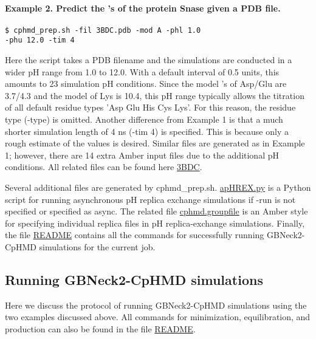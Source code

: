\paragraph{Example 2. Predict the {\pka's} of the protein Snase given a PDB file.}
%
\begin{lstlisting}
$ cphmd_prep.sh -fil 3BDC.pdb -mod A -phl 1.0
-phu 12.0 -tim 4
\end{lstlisting}
%
Here the script takes a PDB filename and the simulations are conducted in a wider pH range from 1.0 to 12.0. 
With a default interval of 0.5 units, this
amounts to 23 simulation pH conditions.
Since the model {\pka's} of Asp/Glu are 3.7/4.3 and 
the model {\pka} of Lys is 10.4, this pH range 
typically allows the titration of
all default residue types 'Asp Glu His Cys Lys'.
For this reason, the residue type (-type) is omitted. 
Another difference from Example 1 is that a much shorter simulation length of 4 ns (-tim 4) is specified.
This is because only a rough estimate of the {\pka} values is desired. 
Similar files are generated as in Example 1; however, 
there are 14 extra Amber input files due to the additional pH conditions.
All related files can be found here \href{https://gitlab.com/shenlab-amber-cphmd/cphmd-tutorial/-/tree/main/gphmd_Amber/gphmd_snase_aphrex/3BDC}{3BDC}. 

Several additional files are generated by cphmd\_prep.sh.
\href{https://gitlab.com/shenlab-amber-cphmd/cphmd-tutorial/-/tree/main/gphmd_Amber/gphmd_kinase_aphrex/5U8L/apHREX.py}{apHREX.py}
is a Python script for running asynchronous pH replica exchange simulations if -run is not specified or specified as async. 
The related file
\href{https://gitlab.com/shenlab-amber-cphmd/cphmd-tutorial/-/tree/main/gphmd_Amber/gphmd_snase_phrex/3BDC/cphmd.groupfile}{cphmd.groupfile} 
is an Amber style for specifying individual replica files in pH replica-exchange simulations. 
Finally, the file \href{https://gitlab.com/shenlab-amber-cphmd/cphmd-tutorial/-/tree/main/gphmd_Amber/gphmd_snase_phrex/3BDC/README}{README} contains all the commands for successfully running GBNeck2-CpHMD simulations for the current job. 

\subsection{Running GBNeck2-CpHMD simulations}
Here we discuss the protocol of running GBNeck2-CpHMD simulations using the two examples discussed above.
All commands for minimization, equilibration, and production can also be found in the file
\href{
https://gitlab.com/shenlab-amber-cphmd/cphmd-tutorial/-/tree/main/gphmd_Amber/gphmd_snase_phrex/3BDC/README}{README}.

